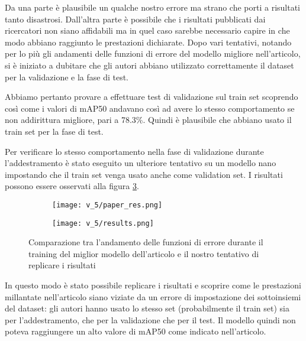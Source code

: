 Da una parte è plausibile un qualche nostro errore ma strano che porti a risultati
tanto disastrosi. Dall'altra parte è possibile che i risultati pubblicati dai 
ricercatori non siano affidabili ma in quel caso sarebbe necessario capire in che modo 
abbiano raggiunto le prestazioni dichiarate. Dopo vari tentativi, notando per lo più 
gli andamenti delle funzioni di errore del modello migliore nell'articolo, si è iniziato a dubitare che gli 
autori abbiano utilizzato correttamente il dataset per la validazione e la fase di test.

Abbiamo pertanto provare a effettuare test di validazione sul train set scoprendo così
come i valori di mAP50 andavano così ad avere lo stesso comportamento se non addirittura
migliore, pari a 78.3\%. Quindi è plausibile che abbiano usato il train set per la fase di test.

Per verificare lo stesso comportamento nella fase di validazione durante l'addestramento
è stato eseguito un ulteriore tentativo su un modello nano impostando che il train set venga usato
anche come validation set. I risultati possono essere osservati alla figura \ref{fig:v5-4}.

    \begin{figure}[!htb]
        \centering
        \begin{subfigure}{.8\textwidth}
            \texttt{[image: v\_5/paper\_res.png]}
            \label{fig:v5-4.1}
        \end{subfigure}
        \begin{subfigure}{.8\textwidth}
            \texttt{[image: v\_5/results.png]}
            \label{fig:v5-4.2}
        \end{subfigure}
        \caption{Comparazione tra l'andamento delle funzioni di errore durante il training
        del miglior modello dell'articolo e il nostro tentativo di replicare i risultati}
        \label{fig:v5-4}
    \end{figure}

In questo modo è stato possibile replicare i risultati e scoprire come le prestazioni
millantate nell'articolo siano viziate da un errore di impostazione dei sottoinsiemi
del dataset: gli autori hanno usato lo stesso set (probabilmente il train set)
sia per l'addestramento, che per la validazione che per il test. 
Il modello quindi non poteva raggiungere un alto valore di mAP50 
come indicato nell'articolo.
